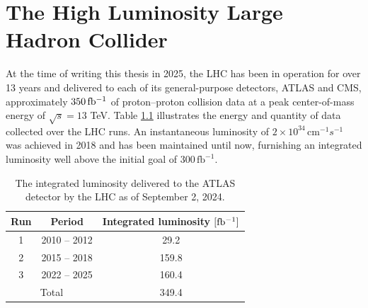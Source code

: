 \chapter{The High Luminosity Large Hadron Collider}


At the time of writing this thesis in 2025, the LHC has been in operation for over 13 years and delivered to each of its general-purpose detectors, ATLAS and CMS, approximately $350\,\mbox{fb\(^{-1}\)}$ of proton--proton collision data at a peak center-of-mass energy of $\sqrt{s}=13$ TeV. 
Table \ref{tab:lhc-int-lumi} illustrates  the energy and quantity of data collected over the LHC runs. 
An instantaneous luminosity of $2\times 10^{34} \, \mathrm{cm}^{-1}s^{-1}$ was achieved in 2018 and has been maintained until now, furnishing an integrated luminosity well above the initial goal of $300\,\mathrm{fb}^{-1}$.

\begin{table}[h!]
    \centering
    \begin{tabular}{|c|c|c|}
    \hline
        Run & Period & Integrated luminosity $[\mbox{fb\(^{-1}\)}]$ \\ \hline
        1 & 2010 -- 2012 & 29.2 \\
        2 & 2015 -- 2018 & 159.8 \\
        3 & 2022 -- 2025 & 160.4 \\ \hline \hline
        \multicolumn{2}{|c|}{Total} & 349.4 \\
        \hline
    \end{tabular}
    \caption{The integrated luminosity delivered to the ATLAS detector by the LHC as of September 2, 2024. }
    \label{tab:lhc-int-lumi}
\end{table}

